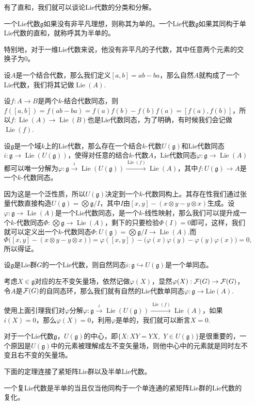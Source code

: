 \documentclass[11pt]{article}
\theoremstyle{definition}
\theoremstyle{plain}
\newcommand{\lag}{{\mathfrak{g}}}
\DeclareMathOperator{\lie}{Lie}
\begin{document}
有了直和，我们就可以谈论Lie代数的分类和分解。

\para 一个Lie代数$\lag$如果没有非平凡理想，则称其为单的。一个Lie代数$\lag$如果其同构于单Lie代数的直和，就称呼其为半单的。

特别地，对于一维Lie代数来说，他没有非平凡的子代数，其中任意两个元素的交换子为0。

\para 设$A$是一个结合代数，那么我们定义$[a,b]=ab-ba$，那么自然$A$就构成了一个Lie代数，我们将其记做$\lie(A)$.

设$f:A\to B$是两个$k$-结合代数同态，则$f([a,b])=f(ab-ba)=f(a)f(b)-f(b)f(a)=[f(a),f(b)]$，所以$f:\lie(A)\to \lie(B)$也是Lie代数同态，为了明确，有时候我们会记做$\lie(f)$. 

\lem 设$\lag$是一个域$k$上的Lie代数，那么存在一个结合$k$-代数$U(\lag)$和Lie代数同态$i:\lag\to \lie(U(\lag))$，使得对任意的结合$k$-代数$A$，Lie代数同态$\varphi:\lag\to \lie(A)$都可以唯一分解为$\varphi:\lag \xrightarrow{i} \lie(U(\lag))\xrightarrow{\lie(f)}\lie(A)$，其中$f:U(\lag)\to A$是一个$k$-代数同态。

因为这是一个泛性质，所以$U(\lag)$决定到一个$k$-代数同构上。其存在性我们通过张量代数直接构造$U(\lag)=\bigotimes \lag/I$，其中$I$由$[x,y]-(x\otimes y-y\otimes x)$生成。设$\varphi:\lag\to \lie(A)$是一个Lie代数同态，是一个$k$-线性映射，那么我们可以提升成一个$k$-代数同态$\Phi:\bigotimes\lag\to \lie(A)$，剩下的只要检验$\Phi(I)=0$即可，这样，我们就可以定义出一个$k$-代数同态$\Phi:U(\lag)=\bigotimes \lag/I\to \lie(A)$.而
\[
	\Phi\bigl([x,y]-(x\otimes y-y\otimes x)\bigr)=\varphi([x,y])-\bigl(\varphi(x)\varphi(y)-\varphi(y)\varphi(x)\bigr)=0,
\]
所以得证。

\para 设$\lag$是Lie群$G$的一个Lie代数，则自然同态$i:\lag\hookrightarrow U(\lag)$是一个单同态。

\proof 考虑$X\in \lag$对应的左不变矢量场，依然记做$\varphi(X)$，显然$\varphi(X):\mathcal{F}(G)\to \mathcal{F}(G)$，令$A$是$\mathcal{F}(G)$的自同态环，那么我们就有自然的Lie代数单同态$\varphi:\lag \to \mathrm{Lie}(A)$.

使用上面引理我们对$\varphi$分解$\varphi:\lag \xrightarrow{i} \lie(U(\lag))\xrightarrow{\lie(f)}\lie(A)$，如果$i(X)=0$，那么$\varphi(X)=0$，利用$\varphi$是单的，我们就可以断言$X=0$.\endproof

\para 对于一个Lie代数$\lag$，$U(\lag)$的中心，即$\{X:XY=YX,$ $Y\in U(\lag)\}$是很重要的，一个原因是$U(\lag)$中的元素被理解成左不变矢量场，则他中心中的元素就是同时左不变且右不变的矢量场。

下面的定理连接了紧矩阵Lie群以及半单Lie代数。

{\thm 一个复Lie代数是半单的当且仅当他同构于一个单连通的紧矩阵Lie群的Lie代数的复化。\endthm}
\end{document}
